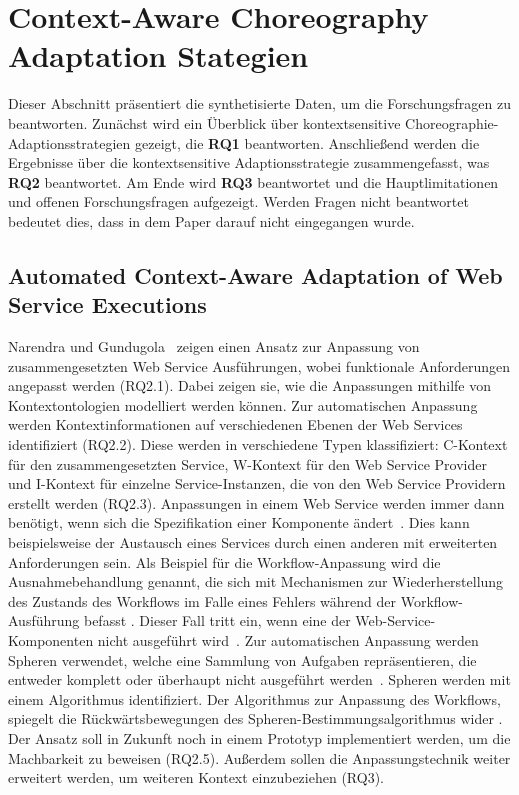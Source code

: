 \documentclass[conference,compsoc]{IEEEtran}
\begin{document}
\section{Context-Aware Choreography Adaptation Stategien}\label{s:contextAwareResults}
Dieser Abschnitt präsentiert die synthetisierte Daten, um die Forschungsfragen zu beantworten. Zunächst wird ein Überblick über  kontextsensitive Choreographie-Adaptionsstrategien gezeigt, die \textbf{RQ1} beantworten. Anschließend werden die Ergebnisse über die kontextsensitive Adaptionsstrategie zusammengefasst, was \textbf{RQ2} beantwortet. Am Ende wird \textbf{RQ3} beantwortet und die Hauptlimitationen und offenen Forschungsfragen aufgezeigt.
Werden Fragen nicht beantwortet bedeutet dies, dass in dem Paper darauf nicht eingegangen wurde.

\subsection{Automated Context-Aware Adaptation of Web Service Executions}
Narendra und Gundugola~\cite{narendra2006automated} zeigen einen Ansatz zur Anpassung von zusammengesetzten Web Service Ausführungen, wobei funktionale Anforderungen angepasst werden (RQ2.1). Dabei zeigen sie, wie die Anpassungen mithilfe von Kontextontologien modelliert werden können. Zur automatischen Anpassung werden Kontextinformationen auf verschiedenen Ebenen der Web Services identifiziert (RQ2.2). Diese werden in verschiedene Typen klassifiziert: C-Kontext für den zusammengesetzten Service, W-Kontext für den Web Service Provider und I-Kontext für einzelne Service-Instanzen, die von den Web Service Providern erstellt werden (RQ2.3)\cite{narendra2006automated}. Anpassungen in einem Web Service werden immer dann benötigt, wenn sich die Spezifikation einer Komponente ändert~\cite{narendra2006automated}. Dies kann beispielsweise der Austausch eines Services durch einen anderen mit erweiterten Anforderungen sein.
Als Beispiel für die Workflow-Anpassung wird die Ausnahmebehandlung genannt, die sich mit Mechanismen zur Wiederherstellung des Zustands des Workflows im Falle eines Fehlers während der Workflow-Ausführung befasst \cite{narendra2006automated}. Dieser Fall tritt ein, wenn eine der Web-Service-Komponenten nicht ausgeführt wird~\cite{narendra2006automated}.
Zur automatischen Anpassung werden Spheren verwendet, welche eine Sammlung von Aufgaben repräsentieren, die entweder komplett oder überhaupt nicht ausgeführt werden~\cite{narendra2006automated}. Spheren werden mit einem Algorithmus identifiziert. Der Algorithmus zur Anpassung des Workflows, spiegelt die Rückwärtsbewegungen des Spheren-Bestimmungsalgorithmus wider \cite{narendra2006automated}.
Der Ansatz soll in Zukunft noch in einem Prototyp implementiert werden, um die Machbarkeit zu beweisen (RQ2.5). Außerdem sollen die Anpassungstechnik weiter erweitert werden, um weiteren Kontext einzubeziehen (RQ3).
\end{document}
